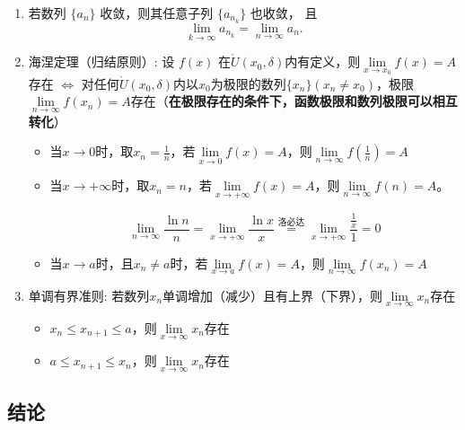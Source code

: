 \documentclass[a4paper,12pt]{article}
\begin{document}
    \begin{enumerate}
        \item 若数列 $\{a_n\}$ 收敛，则其任意子列 $\{a_{n_k}\}$ 也收敛，
        且
        \[
            \lim_{k\to\infty} a_{n_k}
            =
            \lim_{n\to\infty} a_n.
        \]
        \item 海涅定理（归结原则）: 设 $f(x)$ 在$\mathring{U}(x_0,\delta)$内有定义，则$\lim\limits_{x\to x_0} f(x) = A$存在 $\Leftrightarrow$ 对任何$\mathring{U}(x_0,\delta)$内以$x_0$为极限的数列$\{x_n\}(x_n \neq x_0)$，极限$\lim\limits_{n\to \infty} f(x_n) = A$存在（\textbf{在极限存在的条件下，函数极限和数列极限可以相互转化}）
        \begin{itemize}
            \item 当$x\to 0$时，取$x_n = \displaystyle\frac{1}{n}$，若$\lim\limits_{x\to 0} f(x) = A$，则$\lim\limits_{n\to \infty} f(\displaystyle\frac{1}{n}) = A$
            \item 当$x\to +\infty$时，取$x_n = n$，若$\lim\limits_{x\to +\infty} f(x) = A$，则$\lim\limits_{n\to \infty} f(n) = A$。
            \begin{analysisbox}[Example]
                \[
                    \lim_{n\to\infty}\frac{\ln n}{n}
                    = \lim_{x\to+\infty}\frac{\ln x}{x}
                    \overset{\text{洛必达}}=
                    \lim_{x\to+\infty}\frac{\displaystyle\frac{1}{x}}{1}
                    = 0
                \]
            \end{analysisbox}
            \item 当$x\to a$时，且$x_n \neq a$时，若$\lim\limits_{x\to a} f(x) = A$，则$\lim\limits_{n\to \infty} f(x_n) = A$
        \end{itemize}
        \item 单调有界准则: 若数列${x_n}$单调增加（减少）且有上界（下界），则$\lim\limits_{x\to \infty} x_n$存在
        \begin{itemize}
            \item $x_n \leq x_{n+1} \leq a$，则$\lim\limits_{x\to \infty} x_n$存在
            \item $a \leq x_{n+1} \leq x_n$，则$\lim\limits_{x\to \infty} x_n$存在
        \end{itemize}
    \end{enumerate}

    \subsection{结论}
\end{document}
